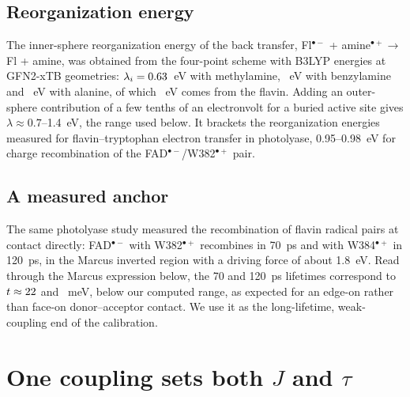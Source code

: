 \documentclass[journal=jpcbfk,manuscript=article,layout=traditional]{achemso}
\begin{document}
\subsection{Reorganization energy}

The inner-sphere reorganization energy of the back transfer,
Fl$^{\bullet-}$ + amine$^{\bullet+}\to$ Fl + amine, was obtained from the
four-point scheme\cite{Nelsen1987} with B3LYP energies at GFN2-xTB
geometries:\cite{Bannwarth2019} $\lambda_i = 0.63$~eV with methylamine,
\lamBenzyl~eV with benzylamine and \lamAla~eV with alanine, of which
\lamFlHalf~eV comes from the flavin. Adding an outer-sphere contribution of a
few tenths of an electronvolt for a buried active site gives $\lambda\approx
0.7$--1.4~eV, the range used below. It brackets the reorganization energies
measured for flavin--tryptophan electron transfer in photolyase,
0.95--0.98~eV for charge recombination of the FAD$^{\bullet-}$/W382$^{\bullet+}$
pair.\cite{Liu2013}

\subsection{A measured anchor}

The same photolyase study measured the recombination of flavin radical pairs at
contact directly: FAD$^{\bullet-}$ with
W382$^{\bullet+}$ recombines in 70~ps and with W384$^{\bullet+}$ in 120~ps, in the
Marcus inverted region with a driving force of about 1.8~eV.\cite{Liu2013} Read
through the Marcus expression below, the 70 and 120~ps lifetimes correspond to
$t\approx22$ and \tAnchorWb~meV, below our computed range, as expected for an
edge-on rather than face-on donor--acceptor contact. We use it as the
long-lifetime, weak-coupling end of the calibration.

\section{One coupling sets both $J$ and $\tau$}
\end{document}
